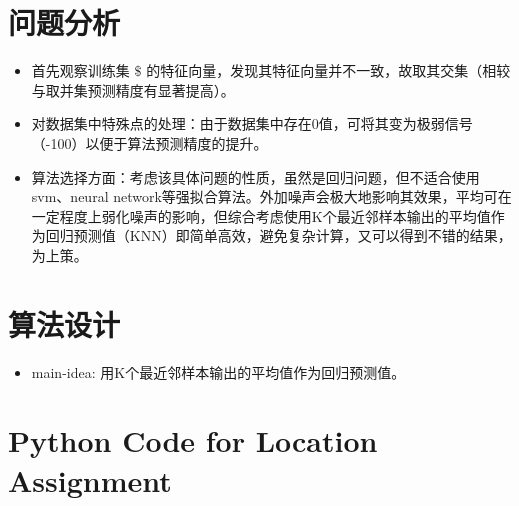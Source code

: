 \documentclass[UTF-8, a4paper, 10pt]{article}
\numberwithin{equation}{section}
\begin{document}
\section{问题分析}
\begin{itemize}
  \item 首先观察训练集 $\$$ 的特征向量，发现其特征向量并不一致，故取其交集（相较与取并集预测精度有显著提高）。
  \item 对数据集中特殊点的处理：由于数据集中存在0值，可将其变为极弱信号（-100）以便于算法预测精度的提升。
  \item 算法选择方面：考虑该具体问题的性质，虽然是回归问题，但不适合使用svm、neural network等强拟合算法。外加噪声会极大地影响其效果，平均可在一定程度上弱化噪声的影响，但综合考虑使用K个最近邻样本输出的平均值作为回归预测值（KNN）即简单高效，避免复杂计算，又可以得到不错的结果，为上策。
\end{itemize}

\section{算法设计}
\begin{itemize}
  \item main-idea: 用K个最近邻样本输出的平均值作为回归预测值。
\end{itemize}

\section{Python Code for Location Assignment}
\end{document}
